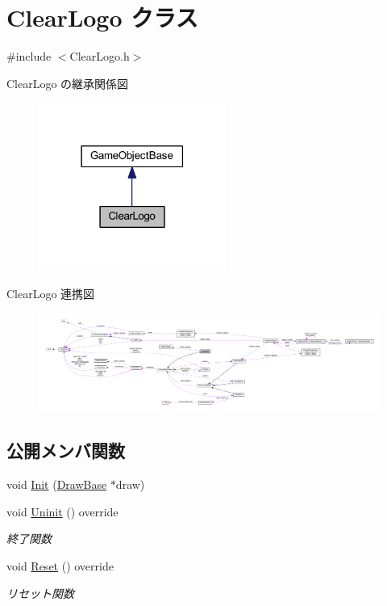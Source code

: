 \hypertarget{class_clear_logo}{}\section{Clear\+Logo クラス}
\label{class_clear_logo}


{\ttfamily \#include $<$Clear\+Logo.\+h$>$}



Clear\+Logo の継承関係図\nopagebreak
\begin{figure}[H]
\begin{center}
\leavevmode
\includegraphics[width=174pt]{class_clear_logo__inherit__graph}
\end{center}
\end{figure}


Clear\+Logo 連携図\nopagebreak
\begin{figure}[H]
\begin{center}
\leavevmode
\includegraphics[width=350pt]{class_clear_logo__coll__graph}
\end{center}
\end{figure}
\subsection*{公開メンバ関数}
\begin{DoxyCompactItemize}
\item 
void \mbox{\hyperlink{class_clear_logo_a46c1a948342d75bb418047a31e70999d}{Init}} (\mbox{\hyperlink{class_draw_base}{Draw\+Base}} $\ast$draw)
\item 
void \mbox{\hyperlink{class_clear_logo_ab55def116615b92a8e8cc40b364b7a4c}{Uninit}} () override
\begin{DoxyCompactList}\small\item\em 終了関数 \end{DoxyCompactList}\item 
void \mbox{\hyperlink{class_clear_logo_aa19369cbace0cc79957ef7b4d4dbd0f5}{Reset}} () override
\begin{DoxyCompactList}\small\item\em リセット関数 \end{DoxyCompactList}\end{DoxyCompactItemize}
